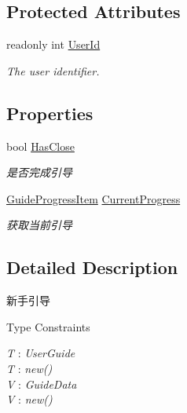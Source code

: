 \subsection*{Protected Attributes}
\begin{DoxyCompactItemize}
\item 
readonly int \mbox{\hyperlink{class_t_net_1_1_com_1_1_generic_1_1_novice_guide_ae42de26a1b9434d9d8b52d9e60db5fcf}{User\+Id}}
\begin{DoxyCompactList}\small\item\em The user identifier. \end{DoxyCompactList}\end{DoxyCompactItemize}
\subsection*{Properties}
\begin{DoxyCompactItemize}
\item 
bool \mbox{\hyperlink{class_t_net_1_1_com_1_1_generic_1_1_novice_guide_a6871908367874066d44f6317a2cfdcf1}{Has\+Close}}
\begin{DoxyCompactList}\small\item\em 是否完成引导 \end{DoxyCompactList}\item 
\mbox{\hyperlink{class_t_net_1_1_com_1_1_model_1_1_guide_progress_item}{Guide\+Progress\+Item}} \mbox{\hyperlink{class_t_net_1_1_com_1_1_generic_1_1_novice_guide_aa0107d519798262e332eba9a3a36d3ea}{Current\+Progress}}
\begin{DoxyCompactList}\small\item\em 获取当前引导 \end{DoxyCompactList}\end{DoxyCompactItemize}


\subsection{Detailed Description}
新手引导 

\begin{Desc}
\item[Type Constraints]\begin{description}
\item[{\em T} : {\em User\+Guide}]\item[{\em T} : {\em new()}]\item[{\em V} : {\em Guide\+Data}]\item[{\em V} : {\em new()}]\end{description}
\end{Desc}


